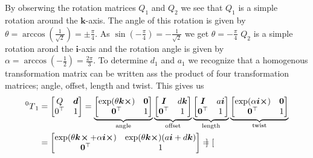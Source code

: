 \documentclass[a4paper]{scrartcl}
\begin{document}
\subsection{}
By obserwing the rotation matrices $Q_1$ and $Q_2$ we see that $Q_1$ is a simple rotation around the $\bm{k}$-axis. The angle of this rotation is given by $\theta = \arccos\left({\tfrac{1}{\sqrt{2}}}\right) = \pm\frac{\pi}{4}$. As $\sin(-\tfrac{\pi}{4}) = -\tfrac{1}{\sqrt{2}}$ we get $\theta = -\tfrac{\pi}{4}$ $Q_2$ is a simple rotation arond the $\bm{i}$-axis and the rotation angle is given by $\alpha = \arccos{\left(-\frac{1}{2} \right)} = \frac{2\pi}{3}$. To determine $d_1$ and $a_1$ we recognize that a homogenous transformation matrix can be written ass the product of four transformation matrices; angle, offset, length and twist. This gives us
\begin{equation}\label{eq:2a}
    \begin{aligned}
        \prescript{0}{}{T}_1 &= \begin{bmatrix}
            Q & \bm{d} \\ 0^\top & 1
        \end{bmatrix} = 
        \underbrace{\begin{bmatrix}
            \exp(\theta \bm{k}\cross) & \bm{0} \\ \bm{0}^\top & 1 
        \end{bmatrix}}_{\text{angle}}
        \underbrace{\begin{bmatrix}
            \bm{I} & d \bm{k} \\ \bm{0}^\top & 1
        \end{bmatrix}}_{\text{offset}}
        \underbrace{\begin{bmatrix}
            \bm{I} & a \bm{i} \\ \bm{0}^\top & 1
        \end{bmatrix}}_{\text{length}}
        \underbrace{\begin{bmatrix}
            \exp(\alpha \bm{i}\cross) & \bm{0} \\ \bm{0}^\top & 1
        \end{bmatrix}}_{\text{twist}}\\
        &= \begin{bmatrix}
            \exp(\theta \bm{k}\!\cross + \alpha \bm{i}\cross) & \exp(\theta \bm{k}\cross)(a \bm{i} + d \bm{k}) \\
            \bm{0}^\top & 1
        \end{bmatrix} = 
        \begin{bmatrix}

\end{bmatrix}
\end{aligned}
\end{equation}
\end{document}
